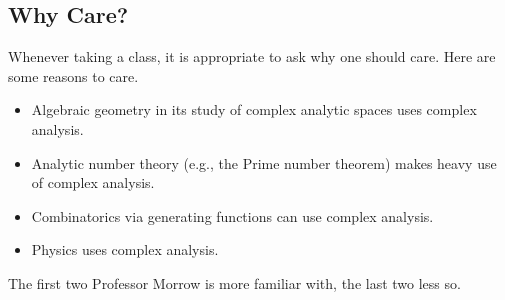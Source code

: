 \subsection{Why Care?}
Whenever taking a class, it is appropriate to ask why one should care. Here are some reasons to care.
\begin{itemize}
	\item Algebraic geometry in its study of complex analytic spaces uses complex analysis.
	\item Analytic number theory (e.g., the Prime number theorem) makes heavy use of complex analysis.
	\item Combinatorics via generating functions can use complex analysis.
	\item Physics uses complex analysis.
\end{itemize}
The first two Professor Morrow is more familiar with, the last two less so.